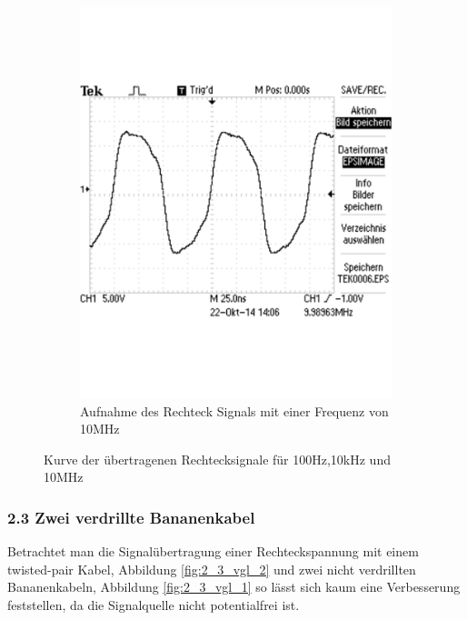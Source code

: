 \documentclass[12pt,a4paper]{article}
\begin{document}
\begin{figure}[H]
\begin{subfigure}[b]{0.28\textwidth}
                \includegraphics[width=\textwidth , scale = 1]{2_2_rech_10mhz.pdf}
                \caption[Aufnahme des Rechtecksignals mit einer Frequenz von 10MHz]{Aufnahme des Rechteck Signals mit einer Frequenz von 10MHz}
  				\label{fig:2_2_rech_10mhz}
        \end{subfigure}
        \caption{Kurve der übertragenen Rechtecksignale für 100Hz,10kHz und 10MHz}
        \label{fig:2_2_rech_vergleich}
\end{figure}

\subsubsection{2.3 Zwei verdrillte Bananenkabel}

Betrachtet man die Signalübertragung einer Rechteckspannung mit einem twisted-pair Kabel, Abbildung \ref{fig:2_3_vgl_2} und zwei nicht verdrillten Bananenkabeln, Abbildung \ref{fig:2_3_vgl_1} so lässt sich kaum eine Verbesserung feststellen, da die Signalquelle nicht potentialfrei ist.
\end{document}
